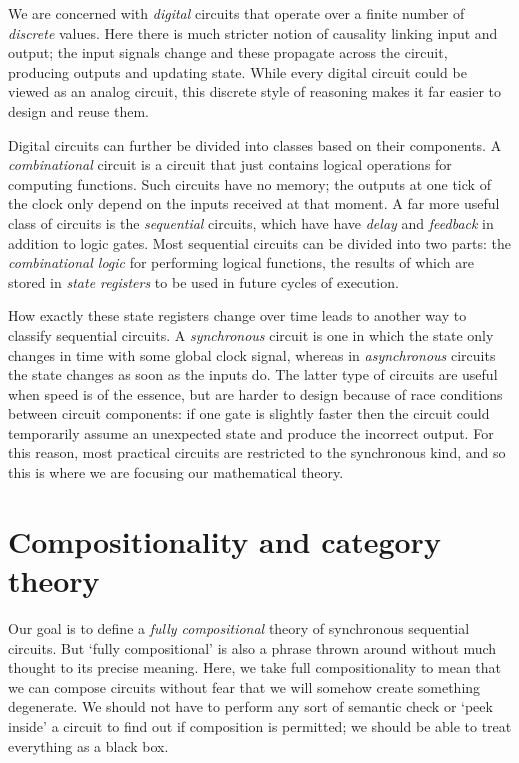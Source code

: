 We are concerned with \emph{digital} circuits that operate over a finite
number of \emph{discrete} values.
Here there is much stricter notion of causality linking input and output; the
input signals change and these propagate across the circuit, producing outputs
and updating state.
While every digital circuit could be viewed as an analog circuit, this
discrete style of reasoning makes it far easier to design and reuse them.

\begin{center}
\end{center}

Digital circuits can further be divided into classes based on their components.
A \emph{combinational} circuit is a circuit that just contains logical
operations for computing functions.
Such circuits have no memory; the outputs at one tick of the clock only depend
on the inputs received at that moment.
A far more useful class of circuits is the \emph{sequential} circuits, which
have have \emph{delay} and \emph{feedback} in addition to logic gates.
Most sequential circuits can be divided into two parts:
the \emph{combinational logic} for performing logical functions, the results of
which are stored in \emph{state registers} to be used in future cycles of
execution.

How exactly these state registers change over time leads to another way
to classify sequential circuits.
A \emph{synchronous} circuit is one in which the state only changes in time with
some global clock signal, whereas in \emph{asynchronous} circuits the state
changes as soon as the inputs do.
The latter type of circuits are useful when speed is of the essence, but are
harder to design because of race conditions between circuit components: if one
gate is slightly faster then the circuit could temporarily assume an unexpected
state and produce the incorrect output.
For this reason, most practical circuits are restricted to the synchronous
kind, and so this is where we are focusing our mathematical theory.

\section{Compositionality and category theory}

Our goal is to define a \emph{fully compositional} theory of synchronous
sequential circuits.
But `fully compositional' is also a phrase thrown around without much thought to
its precise meaning.
Here, we take full compositionality to mean that we can compose circuits
without fear that we will somehow create something degenerate.
We should not have to perform any sort of semantic check or `peek inside' a
circuit to find out if composition is permitted; we should be able to treat
everything as a black box.

